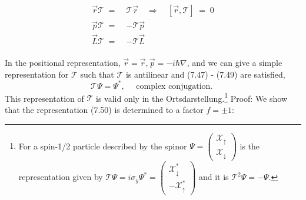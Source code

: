 \begin{align}{\vec{r} \mathcal{T}\;=\;} & {\mathcal{T} \vec{r} \quad \Rightarrow \quad[\vec{r}, \mathcal{T}]\;=\;0} \\ {\vec{p} \mathcal{T}\;=\;} & {-\mathcal{T} \vec{p}} \\ {\vec{L} \mathcal{T}\;=\;} & {-\mathcal{T} \vec{L}}\end{align}
\\
In the positional representation, $\vec{r}=\vec{r},\vec{p}=-i\hbar\nabla$, and we can give a simple representation for $\mathcal{T}$ such that $\mathcal{T}$ is antilinear and (7.47) - (7.49) are satisfied,
\begin{equation}
    \mathcal{T} \Psi=\Psi^{*}, \quad \text { complex conjugation. }
    \end{equation}
This representation of $\mathcal{T}$ is valid only in the Ortsdarstellung.\footnote{For a spin-1/2 particle described by the spinor $\Psi=\left(\begin{array}{c}{\mathcal{X}_{\uparrow}} \\ {\mathcal{X}_{\downarrow}}\end{array}\right)$ is the representation given by $\mathcal{T}\Psi=i\sigma_y\Psi^*=\left(\begin{array}{c}{\mathcal{X}^*_{\downarrow}}\\{-\mathcal{X}^*_{\uparrow}}\end{array}\right)$ and it is $\mathcal{T}^2\Psi = -\Psi$.}
Proof: We show that the representation (7.50) is determined to a factor $f = \pm 1$:

